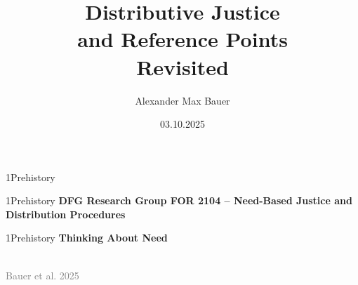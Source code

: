 \documentclass[xcolor=table,9pt,aspectratio=169]{beamer}
\title{Distributive Justice\\and Reference Points\\Revisited}
\subtitle{}
\author{Alexander Max Bauer}
\date{03.10.2025}
\begin{document}
{
\begin{frame}
   \maketitle
\end{frame}
}


\begin{frame}
   \begin{overlayarea}{\textwidth}{0.81\paperheight}{
      \vspace*{11mm}
      \textcolor{uolblue}
      {1\hspace*{1em}Prehistory}
   }
   \end{overlayarea}
\end{frame}


\begin{frame}{\vspace*{10mm}1\hspace*{1em}Prehistory}
   \textbf{DFG Research Group FOR 2104 -- Need-Based Justice and Distribution Procedures}
   \begin{center}
   \end{center}
\end{frame}


\begin{frame}{\vspace*{10mm}1\hspace*{1em}Prehistory}
   \textbf{Thinking About Need}
   
   \medskip
   \begin{center}
      \\
      \textcolor{gray}{Bauer et al. 2025}\\
   \end{center}
\end{frame}
\end{document}

